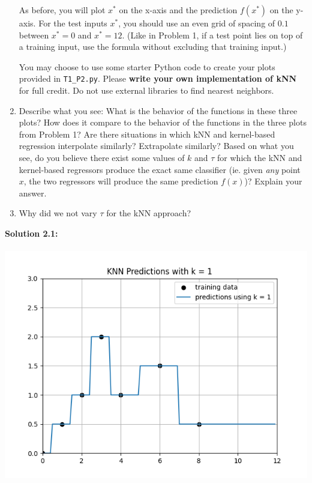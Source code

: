 \documentclass[submit]{harvardml}
\begin{document}
\begin{problem}
\begin{enumerate}
As before, you will plot $x^*$ on the x-axis and the prediction $f(x^*)$ on the y-axis.  For the test inputs $x^*$, you should use an even grid of spacing of $0.1$ between $x^* = 0$ and $x^* = 12$.  (Like in Problem 1, if a test point lies on top of a training input, use the formula without excluding that training input.)
  
  You may choose to use some starter Python code to create your plots
  provided in \verb|T1_P2.py|.  Please \textbf{write your own
    implementation of kNN} for full credit.  Do not use external
  libraries to find nearest neighbors.
  
\item Describe what you see: What is the behavior of the functions in
  these three plots?  How does it compare to the behavior of the
  functions in the three plots from Problem 1?  Are there situations
  in which kNN and kernel-based regression interpolate similarly?
  Extrapolate similarly?  Based on what you see, do you believe there
  exist some values of $k$ and $\tau$ for which the kNN and kernel-based regressors produce the exact same classifier (ie. given \textit{any} point $x$, the two regressors will produce the same prediction $f(x)$)? Explain your answer.
  
\item Why did we not vary $\tau$ for the kNN approach?

\end{enumerate}

\end{problem}


\newpage 
\textbf{Solution 2.1:}\\ \\

\includegraphics[scale=0.75]{k1.png} \\
\end{document}
